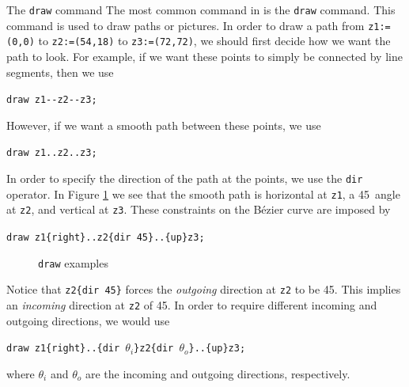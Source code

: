 \begin{subsection}{The \texttt{draw} command}
The most common command in \MP{} is the \texttt{draw} command.  This command is used to draw paths or pictures.  In order to draw a path from \texttt{z1:=(0,0)} to \texttt{z2:=(54,18)} to \texttt{z3:=(72,72)}, we should first decide how we want the path to look.  For example, if we want these points to simply be connected by line segments, then we use \begin{center}\verb|draw z1--z2--z3;|\end{center}  However, if we want a smooth path between these points, we use \begin{center}\verb|draw z1..z2..z3;|\end{center}  In order to specify the direction of the path at the points, we use the \texttt{dir} operator.  In Figure \ref{fig:draw1} we see that the smooth path is horizontal at \texttt{z1}, a 45\textdegree\ angle at \texttt{z2}, and vertical at \texttt{z3}.  These constraints on the B\'{e}zier curve are imposed by \begin{center}\verb|draw z1{right}..z2{dir 45}..{up}z3;|\end{center}
\begin{figure}[ht]
	\begin{center}\end{center}
	\caption{\texttt{draw} examples}\label{fig:draw1}
\end{figure}
Notice that \verb|z2{dir 45}| forces the \textit{outgoing} direction at \texttt{z2} to be 45\textdegree.  This implies an \textit{incoming} direction at \texttt{z2} of 45\textdegree.  In order to require different incoming and outgoing directions, we would use \begin{center}\verb|draw z1{right}..{dir |$\theta_i$\verb|}z2{dir |$\theta_o$\verb|}..{up}z3;|\end{center} where $\theta_i$ and $\theta_o$ are the incoming and outgoing directions, respectively.
\end{subsection}
